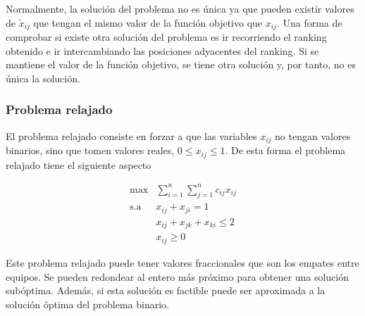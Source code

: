 Normalmente, la solución del problema no es única ya que pueden existir valores de $\tilde{x}_{ij}$ que tengan el mismo valor de la función objetivo que $x_{ij}$. Una forma de comprobar si existe otra solución del problema es ir recorriendo el ranking obtenido e ir intercambiando las posiciones adyacentes del ranking. Si se mantiene el valor de la función objetivo, se tiene otra solución y, por tanto, no es única la solución.

\subsubsection{Problema relajado}

El problema relajado consiste en forzar a que las variables $x_{ij}$ no tengan valores binarios, sino que tomen valores reales, $0 \leq x_{ij} \leq 1$. De esta forma el problema relajado tiene el siguiente aspecto

\begin{equation} \label{eq:problema_relajado}
\begin{array}{rl}
\max         & \sum\limits_{i=1}^{n} \sum\limits_{j=1}^{n} c_{ij} x_{ij}\\
\mathrm{s.a} & x_{ij} + x_{ji} = 1\\
             & x_{ij} + x_{jk} + x_{ki} \leq 2\\
             & x_{ij} \geq 0
\end{array}
\end{equation}

Este problema relajado puede tener valores fraccionales que son los empates entre equipos. Se pueden redondear al entero más próximo para obtener una solución subóptima. Además, si esta solución es factible puede ser aproximada a la solución óptima del problema binario. 

